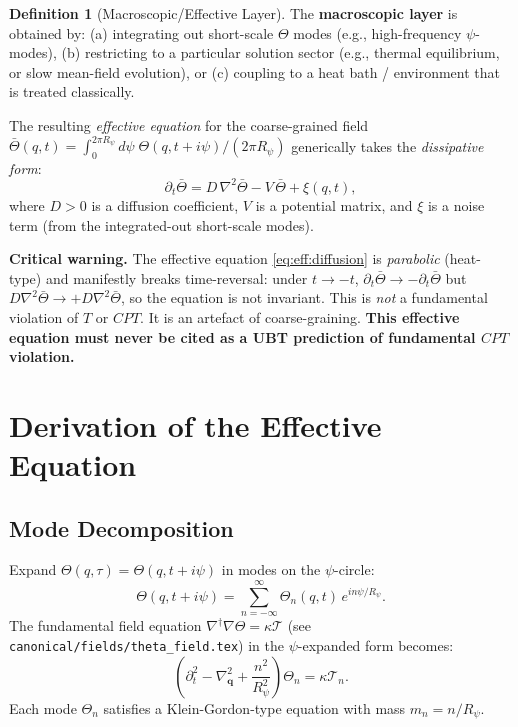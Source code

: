 \documentclass[12pt,a4paper]{article}
\theoremstyle{definition}
\newtheorem{definition}[theorem]{Definition}
\theoremstyle{remark}
\begin{document}
\begin{definition}[Macroscopic/Effective Layer]
\label{def:eff:macro}
The \textbf{macroscopic layer} is obtained by:
(a) integrating out short-scale $\Theta$ modes (e.g., high-frequency $\psi$-modes),
(b) restricting to a particular solution sector (e.g., thermal equilibrium,
  or slow mean-field evolution), or
(c) coupling to a heat bath / environment that is treated classically.

The resulting \emph{effective equation} for the coarse-grained field
$\bar\Theta(q,t) = \int_0^{2\pi R_\psi} d\psi\;\Theta(q,t+i\psi)/(2\pi R_\psi)$
generically takes the \emph{dissipative form}:
\begin{equation}
  \partial_t \bar\Theta
  = D\,\nabla^2\bar\Theta - V\,\bar\Theta + \xi(q,t),
  \label{eq:eff:diffusion}
\end{equation}
where $D > 0$ is a diffusion coefficient, $V$ is a potential matrix, and
$\xi$ is a noise term (from the integrated-out short-scale modes).
\end{definition}

\begin{warnbox}
\textbf{Critical warning.}
The effective equation \eqref{eq:eff:diffusion} is \emph{parabolic} (heat-type)
and manifestly breaks time-reversal: under $t\to-t$, $\partial_t\bar\Theta\to-\partial_t\bar\Theta$
but $D\nabla^2\bar\Theta\to+D\nabla^2\bar\Theta$, so the equation is not
invariant.  This is \emph{not} a fundamental violation of $T$ or $CPT$.
It is an artefact of coarse-graining.
\textbf{This effective equation must never be cited as a UBT prediction of
fundamental $CPT$ violation.}
\end{warnbox}

\section{Derivation of the Effective Equation}
\label{sec:eff:derivation}

\subsection{Mode Decomposition}

Expand $\Theta(q,\tau) = \Theta(q, t+i\psi)$ in modes on the $\psi$-circle:
\begin{equation}
  \Theta(q,t+i\psi) = \sum_{n=-\infty}^{\infty}
  \Theta_n(q,t)\,e^{in\psi/R_\psi}.
  \label{eq:eff:mode_expansion}
\end{equation}
The fundamental field equation $\nabla^\dagger\nabla\Theta = \kappa\mathcal{T}$
(see \texttt{canonical/fields/theta\_field.tex}) in the $\psi$-expanded form becomes:
\begin{equation}
  \left(\partial_t^2 - \nabla_\mathbf{q}^2 + \frac{n^2}{R_\psi^2}\right)\Theta_n
  = \kappa\mathcal{T}_n.
  \label{eq:eff:mode_eq}
\end{equation}
Each mode $\Theta_n$ satisfies a Klein-Gordon-type equation with mass
$m_n = n/R_\psi$.
\end{document}
